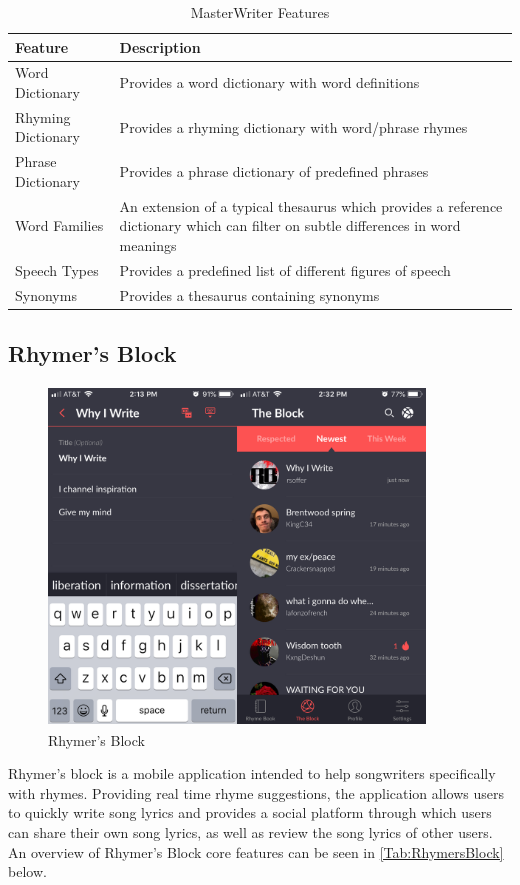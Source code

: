 \begin{table}[ht]
	\centering
	\begin{tabular}{ | l | p{10cm} |}
		\hline
		\textbf{Feature} & \textbf{Description}\\ \hline
		Word Dictionary & Provides a word dictionary with word
		definitions \\ \hline
		Rhyming Dictionary & Provides a rhyming dictionary with
		word/phrase rhymes \\ \hline
		Phrase Dictionary & Provides a phrase dictionary of predefined
		phrases \\ \hline
		Word Families & An extension of a typical thesaurus which
		provides a reference dictionary which can
		filter on subtle differences in word
		meanings \\ \hline
		Speech Types & Provides a predefined list of different
		figures of speech \\ \hline
		Synonyms & Provides a thesaurus containing
		synonyms\\ \hline
	\end{tabular}
	\label{Tab:MasterWriter}
	\caption{MasterWriter Features}
\end{table}

\noindent
\newline
\subsection{Rhymer's Block}

\begin{figure}[h]
	\includegraphics[width=10cm, height=9cm]{./figures/fig10}
	\centering
	\caption{Rhymer's Block}
	\label{fig:fig10}
\end{figure}
\noindent
\newline
Rhymer's block is a mobile application intended to help songwriters specifically with rhymes. Providing real time rhyme suggestions, the application allows users to quickly write song lyrics and provides a social platform through which users can share their own song lyrics, as well as review the song lyrics of other users. An overview of Rhymer's Block core features can be seen in \autoref{Tab:RhymersBlock} below.

